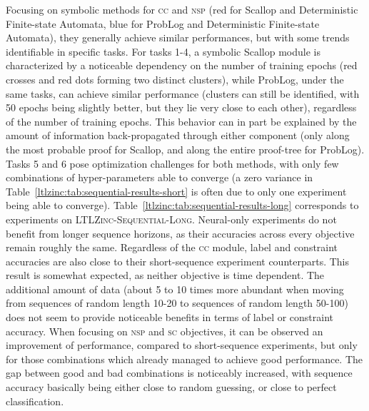 %
Focusing on symbolic methods for \textsc{cc} and \textsc{nsp} (red for Scallop and Deterministic Finite-state Automata, blue for ProbLog and Deterministic Finite-state Automata), they generally achieve similar performances, but with some trends identifiable in specific tasks. For tasks 1-4, a symbolic Scallop module is characterized by a noticeable dependency on the number of training epochs (red crosses and red dots forming two distinct clusters), while ProbLog, under the same tasks, can achieve similar performance (clusters can still be identified, with 50 epochs being slightly better, but they lie very close to each other), regardless of the number of training epochs. This behavior can in part be explained by the amount of information back-propagated through either component (only along the most probable proof for Scallop, and along the entire proof-tree for ProbLog). Tasks 5 and 6 pose optimization challenges for both methods, with only few combinations of hyper-parameters able to converge (a zero variance in Table~\ref{ltlzinc:tab:sequential-results-short} is often due to only one experiment being able to converge).
%
Table~\ref{ltlzinc:tab:sequential-results-long} corresponds to experiments on \textsc{LTLZinc-Sequential-Long}. Neural-only experiments do not benefit from longer sequence horizons, as their accuracies across every objective remain roughly the same. Regardless of the \textsc{cc} module, label and constraint accuracies are also close to their short-sequence experiment counterparts. This result is somewhat expected, as neither objective is time dependent. The additional amount of data (about 5 to 10 times more abundant when moving from sequences of random length 10-20 to sequences of random length 50-100) does not seem to provide noticeable benefits in terms of label or constraint accuracy.
When focusing on \textsc{nsp} and \textsc{sc} objectives, it can be observed an improvement of performance, compared to short-sequence experiments, but only for those combinations which already managed to achieve good performance. The gap between good and bad combinations is noticeably increased, with sequence accuracy basically being either close to random guessing, or close to perfect classification.
